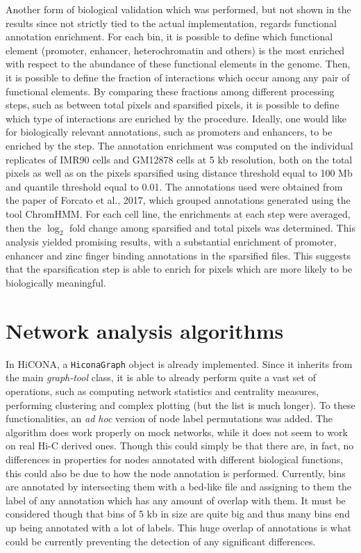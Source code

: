 Another form of biological validation which was performed, but not shown in the results since not strictly tied to the actual implementation, regards functional annotation enrichment. For each bin, it is possible to define which functional element (promoter, enhancer, heterochromatin and others) is the most enriched with respect to the abundance of these functional elements in the genome. Then, it is possible to define the fraction of interactions which occur among any pair of functional elements. By comparing these fractions among different processing steps, such as between total pixels and sparsified pixels, it is possible to define which type of interactions are enriched by the procedure. Ideally, one would like for biologically relevant annotations, such as promoters and enhancers, to be enriched by the step. The annotation enrichment was computed on the individual replicates of IMR90 cells and GM12878 cells at 5 kb resolution, both on the total pixels as well as on the pixels sparsified using distance threshold equal to 100 Mb and quantile threshold equal to 0.01. The annotations used were obtained from the paper of Forcato et al., 2017\cite{toolcomparison2017}, which grouped annotations generated using the tool ChromHMM\cite{chromhmm2014}. For each cell line, the enrichments at each step were averaged, then the $\log_2$ fold change among sparsified and total pixels was determined. This analysis yielded promising results, with a substantial enrichment of promoter, enhancer and zinc finger binding annotations in the sparsified files. This suggests that the sparsification step is able to enrich for pixels which are more likely to be biologically meaningful.


\section{Network analysis algorithms}

In HiCONA, a \texttt{HiconaGraph} object is already implemented. Since it inherits from the main \textit{graph-tool} class, it is able to already perform quite a vast set of operations, such as computing network statistics and centrality measures, performing clustering and complex plotting (but the list is much longer). To these functionalities, an \textit{ad hoc} version of node label permutations was added. The algorithm does work properly on mock networks, while it does not seem to work on real Hi-C derived ones. Though this could simply be that there are, in fact, no differences in properties for nodes annotated with different biological functions, this could also be due to how the node annotation is performed. Currently, bins are annotated by intersecting them with a bed-like file and assigning to them the label of any annotation which has any amount of overlap with them. It must be considered though that bins of 5 kb in size are quite big and thus many bins end up being annotated with a lot of labels. This huge overlap of annotations is what could be currently preventing the detection of any significant differences.

